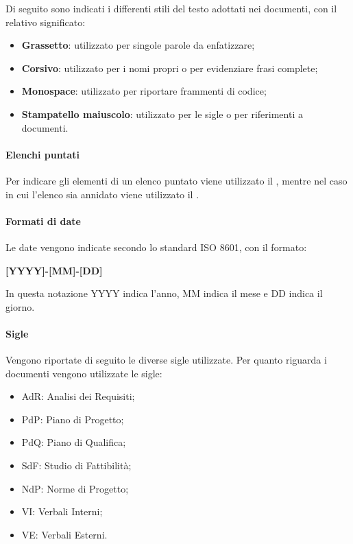 Di seguito sono indicati i differenti stili del testo adottati nei documenti, con il relativo significato:
\begin{itemize}
    \item \textbf{Grassetto}: utilizzato per singole parole da enfatizzare;
    \item \textbf{Corsivo}: utilizzato per i nomi propri o per evidenziare frasi complete;
    \item \textbf{Monospace}: utilizzato per riportare frammenti di codice;
    \item \textbf{Stampatello maiuscolo}: utilizzato per le sigle o per riferimenti a documenti.
\end{itemize}

\paragraph{Elenchi puntati}
\label{par:elenchi}

Per indicare gli elementi di un elenco puntato viene utilizzato il , mentre nel caso in cui l'elenco 
sia annidato viene utilizzato il .

\paragraph{Formati di date}
\label{par:date}

Le date vengono indicate secondo lo standard \textsc{ISO 8601}, con il formato:
\begin{center}
    \textbf{[YYYY]-[MM]-[DD]}
\end{center}
In questa notazione YYYY indica l'anno, MM indica il mese e DD indica il giorno.

\paragraph{Sigle}
\label{par:sigle}

Vengono riportate di seguito le diverse sigle utilizzate.
Per quanto riguarda i documenti vengono utilizzate le sigle:
\begin{itemize}
    \item AdR: Analisi dei Requisiti;
    \item PdP: Piano di Progetto;
    \item PdQ: Piano di Qualifica;
    \item SdF: Studio di Fattibilità;
    \item NdP: Norme di Progetto;
    \item VI: Verbali Interni;
    \item VE: Verbali Esterni.
\end{itemize}

